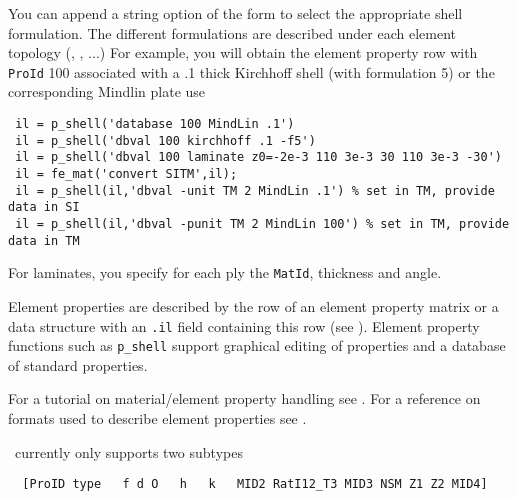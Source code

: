You can append a string option of the form  to select the appropriate shell formulation. The different formulations are described under each element topology (\triaa, , ...)
For example, you will obtain the element property row with {\tt ProId} 100 associated with a .1 thick Kirchhoff shell (with formulation 5) or the corresponding Mindlin plate use

\begin{verbatim}
 il = p_shell('database 100 MindLin .1')
 il = p_shell('dbval 100 kirchhoff .1 -f5')
 il = p_shell('dbval 100 laminate z0=-2e-3 110 3e-3 30 110 3e-3 -30')
 il = fe_mat('convert SITM',il);
 il = p_shell(il,'dbval -unit TM 2 MindLin .1') % set in TM, provide data in SI
 il = p_shell(il,'dbval -punit TM 2 MindLin 100') % set in TM, provide data in TM
\end{verbatim}%


For laminates, you specify for each ply the {\tt MatId}, thickness and angle.


Element properties are described by the row of an element property matrix or a data structure with an {\tt .il} field containing this row (see ). Element property functions such as {\tt p\_shell} support graphical editing of properties and a database of standard properties. 

For a tutorial on material/element property handling see . For a reference on formats used to describe element properties see . 

\pshell\ currently only supports two subtypes


\begin{verbatim}
  [ProID type   f d O   h   k   MID2 RatI12_T3 MID3 NSM Z1 Z2 MID4]
\end{verbatim}



